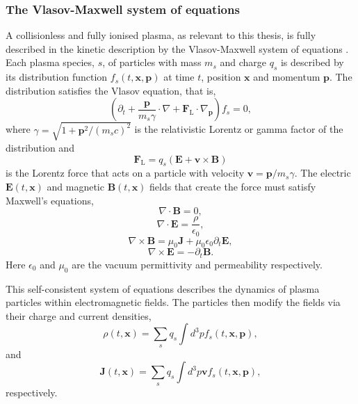\subsubsection{The Vlasov-Maxwell system of equations}
A collisionless and fully ionised plasma, as relevant to this thesis, is fully described in the kinetic description by the Vlasov-Maxwell system of equations \cite{derouillatSmileiCollaborativeOpensource2018}. Each plasma species, $s$, of particles with mass $m_s$ and charge $q_s$ is described by its distribution function $f_s(t,\mathbf{x},\mathbf{p})$ at time $t$, position $\mathbf{x}$ and momentum $\mathbf{p}$. The distribution satisfies the Vlasov equation, that is,
\begin{equation}
	(\partial_t + \frac{\mathbf{p}}{m_s\gamma} \cdot \nabla + \mathbf{F}_\mathrm{L} \cdot \nabla_\mathbf{p})f_s = 0,
\end{equation}
where $\gamma = \sqrt{1+\mathbf{p}^2/(m_sc)^2}$ is the relativistic Lorentz or gamma factor of the distribution and 
\begin{equation}
	\mathbf{F}_\mathrm{L} = q_s(\mathbf{E} + \mathbf{v} \times \mathbf{B})
\end{equation}
is the Lorentz force that acts on a particle with velocity $\mathbf{v}  = \mathbf{p}/m_s\gamma$. The electric $\mathbf{E}(t,\mathbf{x})$ and magnetic $\mathbf{B}(t,\mathbf{x})$ fields that create the force must satisfy Maxwell's equations,
\begin{equation}
	\nabla \cdot \mathbf{B} = 0,
\end{equation}
\begin{equation}
	\nabla \cdot \mathbf{E} = \frac{\rho}{\epsilon_0},
\end{equation}
\begin{equation}
	\nabla \times \mathbf{B} = \mu_0 \mathbf{J} + \mu_0 \epsilon_0 \partial_t \mathbf{E},
\end{equation}
\begin{equation}
	\nabla \times \mathbf{E} =-\partial_t \mathbf{B}.
\end{equation}
Here $\epsilon_0$ and $\mu_0$ are the vacuum permittivity and permeability respectively.

This self-consistent system of equations describes the dynamics of plasma particles within electromagnetic fields. The particles then modify the fields via their charge and current densities,
\begin{equation}
	\rho(t,\mathbf{x}) = \sum_s q_s \int d^3pf_s(t,\mathbf{x},\mathbf{p}),
\end{equation}
and 
\begin{equation}
	\mathbf{J}(t,\mathbf{x}) = \sum_s q_s \int d^3p\mathbf{v}f_s(t,\mathbf{x},\mathbf{p}),
\end{equation}
respectively.

